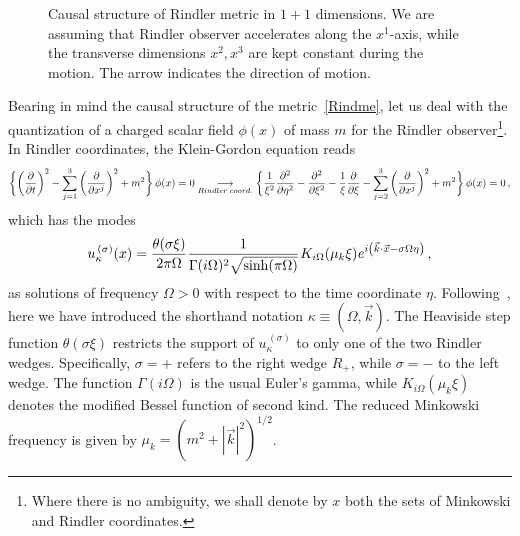 \documentclass[floats,prd,aps,amssymb,nofootinbib,showkeys]{revtex4}
\newcommand{\be}{\begin{equation}}\newcommand{\ee}{\end{equation}}
\begin{document}
\begin{figure}[t]
\caption{\small{Causal structure of Rindler metric in $1+1$ dimensions. 
We are assuming that Rindler observer accelerates along the $x^1$-axis, 
while the transverse dimensions $x^2, x^3$ are kept constant during the motion. The arrow indicates the direction of motion.}}
\label{figure:Rindler}
\end{figure}


Bearing in mind the causal structure of the metric~\eqref{Rindme}, 
let us deal with the quantization of a charged scalar 
field $\phi(x)$ of mass $m$ for the Rindler observer\footnote{Where there is no ambiguity, 
we shall denote by $x$ both the sets
of Minkowski and Rindler coordinates.}. 
In Rindler coordinates, the Klein-Gordon equation reads
\begin{equation}
\bigg\{{\bigg(\frac{\partial}{\partial t}\bigg)}^2-\sum_{j=1}^{3}{\bigg(\frac{\partial}{\partial x^j}\bigg)}^2+m^2 \bigg\}\hspace{0.1mm}\,\phi(x)=0\underset{Rindler\;coord.}{\longrightarrow}
\bigg\{\frac{1}{\xi^2}\frac{\partial^2}{\partial\eta^2}-\frac{\partial^2}{\partial\xi^2}-\frac{1}{\xi}\frac{\partial}{\partial\xi}-\sum_{j=2}^{3}{\bigg(\frac{\partial}{\partial x^j}\bigg)}^2+m^2 \bigg\}\hspace{0.1mm}\,\phi(x)=0\,,
\label{KG}
\end{equation}
which has the modes
\be
u_\kappa^{\,(\sigma)}(x)=
\frac{\theta(\sigma\xi)}{2\pi\Omega}\frac{1}{\Gamma(i\Omega)^2\sqrt{\sinh(\pi\Omega)}}\hspace{0.2mm}K_{i\Omega}(\mu_k\xi)\hspace{0.1mm}e^{i\left(\vec{k}\cdot\vec{x}-\sigma\Omega\eta\right)}\,, 
\label{eqn:rindlermodes}
\end{equation}
as solutions of frequency $\Omega>0$ with respect
to the time coordinate $\eta$. Following~\cite{Takagi}, 
here we have introduced the shorthand 
notation $\kappa\equiv(\Omega, \vec{k})$.
The Heaviside step function $\theta(\sigma\xi)$
restricts the support of $u_\kappa^{\,(\sigma)}$ 
to only one of the two Rindler wedges. Specifically, 
$\sigma=+$ refers to the right wedge $R_{+}$, while
$\sigma=-$ to the left wedge. The function 
$\Gamma(i\Omega)$ is the usual Euler's gamma, while $K_{i\Omega}(\mu_k\xi)$ denotes the modified Bessel
function of second kind. The reduced Minkowski frequency is given by  $\mu_k={(m^2+|\vec{k}|^2)}^{1/2}$. 
\end{document}
